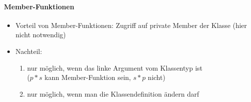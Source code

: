 \documentclass{article}
\begin{document}
\paragraph*{Member-Funktionen}
	\begin{itemize}
		\item Vorteil von Member-Funktionen: Zugriff auf private Member der Klasse (hier nicht notwendig)
		\item Nachteil: 
			\begin{enumerate}
				\item nur möglich, wenn das linke Argument vom Klassentyp ist \\ ($p*s$ kann Member-Funktion sein, $s*p$ nicht)
				\item nur möglich, wenn man die Klassendefinition ändern darf
			\end{enumerate}
	\end{itemize}
\end{document}
